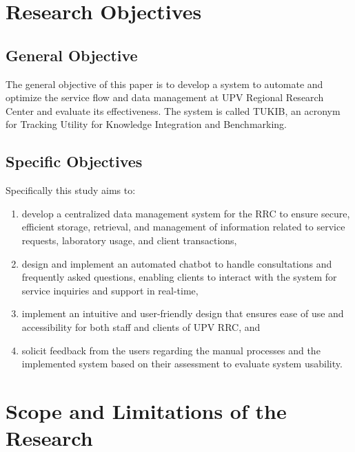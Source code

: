 \section{Research Objectives}
\label{sec:researchobjectives}

\subsection{General Objective}
\label{sec:generalobjective}

The general objective of this paper is to develop a system to automate and optimize the service flow and data management at UPV Regional Research Center and evaluate its effectiveness. The system is called TUKIB, an acronym for Tracking Utility for Knowledge Integration and Benchmarking. 

\subsection{Specific Objectives}
\label{sec:specificobjectives}

Specifically this study aims to:

\begin{enumerate}
	
	\item develop a centralized data management system for the RRC to ensure secure, efficient storage, retrieval, and management of information related to service requests, laboratory usage, and client transactions,
	
	\item design and implement an automated chatbot to handle consultations and frequently asked questions, enabling clients to interact with the system for service inquiries and support in real-time,
	
	
	\item implement an intuitive and user-friendly design that ensures ease of use and accessibility for both staff and clients of UPV RRC, and
	
	\item solicit feedback from the users regarding the manual processes and the implemented system based on their assessment to evaluate system usability.
	
\end{enumerate}

\section{Scope and Limitations of the Research}
\label{sec:scopelimitations}

